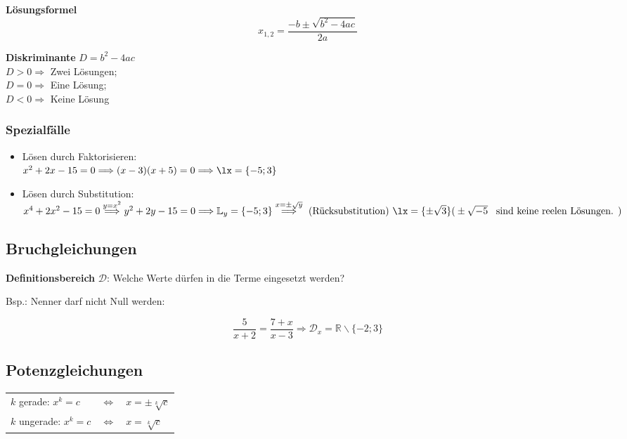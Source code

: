 \begin{multicols}{2}
\begin{tcolorbox}[colback=white]
  \textbf{Lösungsformel}
  $$x_{1,2} = \frac{-b \pm \sqrt{b^2-4ac}}{2a}$$
\end{tcolorbox}
\textbf{Diskriminante} $D = b^2-4ac$\\
$D>0\Longrightarrow$ Zwei Lösungen;\\
$D=0\Longrightarrow$ Eine Lösung;\\
$D<0\Longrightarrow$ Keine Lösung

\subsubsection*{Spezialfälle}
\begin{itemize}
\item Lösen durch Faktorisieren:\\
$x^2+2x-15=0 \Longrightarrow (x-3)(x+5)=0 \Longrightarrow \lx=\{-5; 3\}$ %

\item Lösen durch Substitution:\\
$x^4+2x^2-15=0 \stackrel{y=x^2}{\Longrightarrow}\\
y^2+2y-15=0 \Longrightarrow \mathbb{L}_y=\{-5;3\} \stackrel{x=\pm{}\sqrt{y}}{\Longrightarrow}
\textrm{ (Rücksubstitution) } \lx=\{\pm\sqrt{3}\}\\
\textrm{(} \pm\sqrt{-5} \textrm{ \, sind keine reelen Lösungen. )}$

\end{itemize}

\subsection*{Bruchgleichungen}

\textbf{Definitionsbereich} $\mathcal{D}$: Welche Werte dürfen in die Terme eingesetzt werden?

Bsp.: Nenner darf nicht Null werden:

$$\frac5{x+2}=\frac{7+x}{x-3} \Rightarrow{} \mathcal{D}_x=\mathbb{R}\backslash{}\{-2; 3\}$$

\subsection*{Potenzgleichungen}


\begin{tabular}{lcl}
$k$ gerade:   $x^k=c$ & $\Leftrightarrow$ & $x=\pm\sqrt[k]{c}$\\
$k$ ungerade: $x^k=c$ & $\Leftrightarrow$ & $x=\sqrt[k]{c}$\\
\end{tabular}


\end{multicols}
